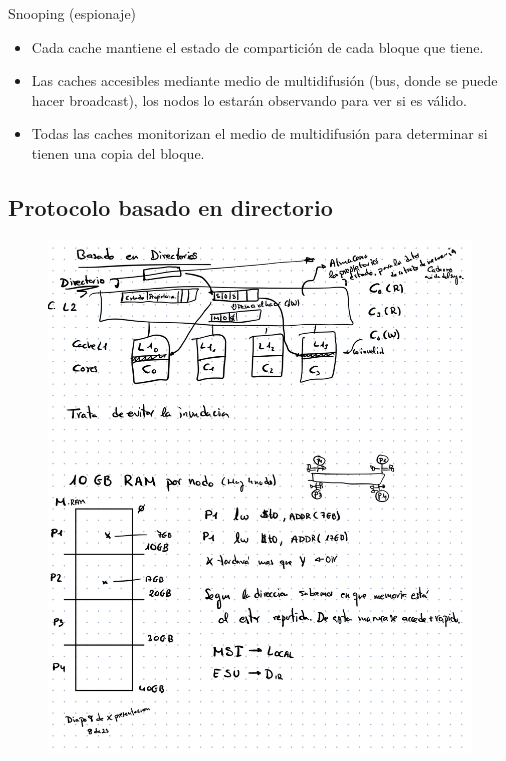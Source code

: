 \documentclass[12pt, twoside, openright]{report} %
\begin{document}
      Snooping (espionaje)

      \begin{itemize}
      
      \item
        Cada cache mantiene el estado de compartición de cada bloque
        que tiene.
      \item
        Las caches accesibles mediante medio de multidifusión (bus,
        donde se puede hacer broadcast), los nodos lo estarán
        observando para ver si es válido.
      \item
        Todas las caches monitorizan el medio de multidifusión para
        determinar si tienen una copia del bloque.
      \end{itemize}

      
\subsection{Protocolo basado en directorio}
\begin{figure}[H]
	{\includegraphics[scale=.3]{Untitled 47.png}}
\end{figure}
\end{document}
